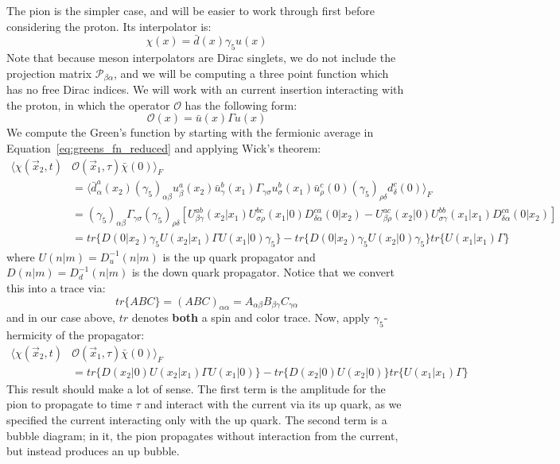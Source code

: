 \documentclass[11pt, oneside]{article}   	%
\theoremstyle{definition}
\begin{document}
The pion is the simpler case, and will be easier to work through first before considering the proton. Its interpolator is:
\begin{equation}
	\chi(x) = \bar d(x)\gamma_5 u(x)
\end{equation}
Note that because meson interpolators are Dirac singlets, we do not include the projection matrix $\mathcal P_{\beta\alpha}$, and we will be 
computing a three point function which has no free Dirac indices. We will work with an current insertion interacting with the proton, in which the 
operator $\mathcal O$ has the following form: 
\begin{equation}
	\mathcal O(x) = \bar u(x)\Gamma u(x)
\end{equation}
We compute the Green's function by starting with the fermionic average in Equation~\ref{eq:greens_fn_reduced} and applying Wick's theorem:
\begin{align}
	\langle\chi(\vec x_2, t) & \mathcal O(\vec x_1, \tau)\bar\chi(0)\rangle_F \nonumber\\ 
	&= \langle \bar d_\alpha^a(x_2)\left(\gamma_5\right)_{\alpha\beta}
	 u_\beta^a(x_2)\bar u_\gamma^b(x_1)\Gamma_{\gamma\sigma}u_\sigma^b(x_1)\bar 
	 u_\rho^c(0)\left(\gamma_5\right)_{\rho\delta}
	 d_\delta^c(0)\rangle_F \nonumber \\
	 &= (\gamma_5)_{\alpha\beta}\Gamma_{\gamma\sigma}(\gamma_5)_{\rho\delta}\left[
	U_{\beta\gamma}^{ab}(x_2 | x_1) U_{\sigma\rho}^{bc}(x_1 | 0) D_{\delta\alpha}^{ca}(0 | x_2)
	- U_{\beta\rho}^{ac}(x_2 | 0) U_{\sigma\gamma}^{bb}(x_1 | x_1) D_{\delta\alpha}^{ca}(0 | x_2)
	 \right] \nonumber \\
	 &= tr\{D(0 | x_2)\gamma_5 U(x_2 | x_1) \Gamma U(x_1 | 0) \gamma_5\} - tr\{D(0 | x_2)\gamma_5 U(x_2 | 0) 
	 \gamma_5 \} tr\{U(x_1 | x_1)\Gamma\}
	 \label{eq:pion_threept}
\end{align}
where $U(n|m) = D_u^{-1}(n|m)$ is the up quark propagator and $D(n|m) = D_d^{-1}(n|m)$ is the down quark propagator. Notice that we convert 
this into a trace via:
\begin{equation}
	tr\{ABC\} = (ABC)_{\alpha\alpha} = A_{\alpha\beta} B_{\beta\gamma} C_{\gamma\alpha}
\end{equation}
and in our case above, $tr$ denotes \textbf{both} a spin and color trace. Now, apply $\gamma_5$-hermicity of the propagator: 
\begin{align}
	\langle\chi(\vec x_2, t) & \mathcal O(\vec x_1, \tau)\bar\chi(0)\rangle_F\nonumber \\
	&= tr\{D(x_2 | 0) U(x_2 | x_1) \Gamma U(x_1 | 0) \} - tr\{D(x_2 | 0) U(x_2 | 0) \}tr\{U(x_1 | x_1)\Gamma\}
\end{align}
This result should make a lot of sense. The first term is the amplitude for the pion to propagate to time $\tau$ and interact 
with the current via its up quark, as we specified the current interacting only with the up quark. The second term is a bubble 
diagram; in it, the pion propagates without interaction from the current, but instead produces an up bubble. 
\end{document}
